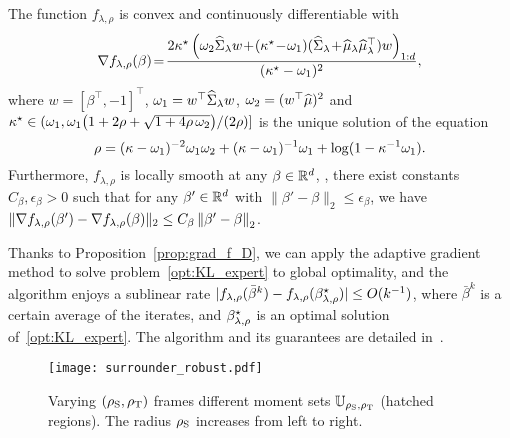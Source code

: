 \documentclass{article}
\begin{document}
\begin{proposition} \label{prop:grad_f_D}
   
    
    The function $f_{\lambda, \rho}$ is convex and continuously differentiable with
    \begin{align*}\label{eq:grad_f_D}
        \nabla f_{\lambda, \rho} (\beta) \!=\! \frac{2\dualvar\opt \left(  \omega_2  \covsa_\lambda w \!+\! (\dualvar\opt \! - \!\omega_1 ) (\covsa_\lambda \! +\! \msa_\lambda \msa_\lambda^\top) w \right)_{1:d}}{(\dualvar\opt  - \omega_1 )^2}  ,
    \end{align*}
    where 
    $w = [\beta^\top, -1]^\top$, $\omega_1 = w^\top \widehat{\Sigma}_\lambda w $, $\omega_2  = (w^\top \widehat {\mu})^2$ and $\kappa^\star\in ( \omega_1 , \omega_1  \big(1 + 2\rho + \sqrt{1 + 4 \rho\, \omega_2 } \big)/(2\rho)]$ is the unique solution of the equation
    \begin{equation*}
        \rho = (\kappa - \omega_1 )^{-2} \omega_1 \omega_2  + (\kappa - \omega_1 )^{-1} \omega_1  + \log( 1 - \kappa^{-1} \omega_1 ).
    \end{equation*}
    Furthermore, $f_{\lambda, \rho}$ is locally smooth at any $\beta \in \mathbb{R}^d$, \ie, there exist constants $C_\beta, \epsilon_\beta> 0$ such that for any $\beta'\in\mathbb{R}^d$ with $\| \beta' - \beta \|_2 \le \epsilon_\beta$,
we have $\| \nabla f_{\lambda, \rho} (\beta') - \nabla f_{\lambda, \rho} (\beta) \|_2 \le C_\beta \left\|\beta' - \beta\right\|_2$.
\end{proposition}

Thanks to Proposition~\ref{prop:grad_f_D}, we can apply the adaptive gradient method to solve problem~\eqref{opt:KL_expert} to global optimality, and the algorithm enjoys a sublinear rate $| f_{\lambda, \rho}(\bar{\beta}^k) - f_{\lambda, \rho}(\beta_{\lambda, \rho}^\star ) | \le O(k^{-1})$, where $\bar{\beta}^k$ is a certain average of the iterates, and $\beta_{\lambda, \rho}^\star $ is an optimal solution of~\eqref{opt:KL_expert}. The algorithm and its guarantees are detailed in~\citet{malitsky2019adaptive}.

\begin{figure*}[ht!]
    \centering
    \texttt{[image: surrounder\_robust.pdf]}
    \vspace{-8mm}
    \caption{Varying $(\rho_{\rm S}, \rho_{\rm T})$ frames different moment sets $\mathbb U_{\rho_{\rm S}, \rho_{\rm T}}$ (hatched regions). The radius $\rho_{\rm S}$ increases from left to right.}
    \label{fig:SI}
    \vspace{-3mm}
\end{figure*}
\end{document}
